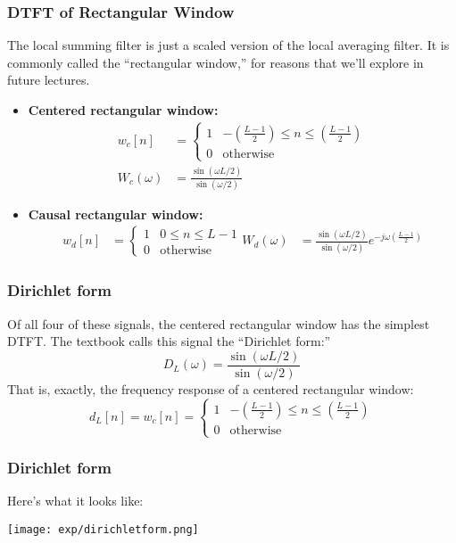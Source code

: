 \documentclass{beamer}
\begin{document}
\begin{frame}
  \frametitle{DTFT of Rectangular Window}

  The local summing filter is just a scaled version of the local
  averaging filter. It is commonly called the ``rectangular window,''
  for reasons that we'll explore in future lectures.
  \begin{itemize}
  \item {\bf Centered rectangular window:}
    \begin{align*}
      w_c[n] &= \begin{cases} 1& -\left(\frac{L-1}{2}\right)\le n\le\left(\frac{L-1}{2}\right)\\
        0&\mbox{otherwise}\end{cases}\\
      W_c(\omega)&=\frac{\sin(\omega L/2)}{\sin(\omega/2)}
    \end{align*}
  \item {\bf Causal rectangular window:}
    \begin{align*}
      w_d[n] &= \begin{cases} 1& 0\le n\le L-1\\
        0&\mbox{otherwise}\end{cases}
      W_d(\omega) &=\frac{\sin(\omega L/2)}{\sin(\omega/2)}e^{-j\omega\left(\frac{L-1}{2}\right)}
    \end{align*}
  \end{itemize}
\end{frame}


\begin{frame}
  \frametitle{Dirichlet form}

  Of all four of these signals, the centered rectangular window has
  the simplest DTFT. The textbook calls this signal the ``Dirichlet
  form:''
  \[
  D_L(\omega) = \frac{\sin(\omega L/2)}{\sin(\omega/2)}
  \]
  That is, exactly, the frequency response of a centered rectangular window:
  \[
  d_L[n] = w_c[n] = \begin{cases}
    1 & -\left(\frac{L-1}{2}\right)\le n\le \left(\frac{L-1}{2}\right)\\
    0 & \mbox{otherwise}
  \end{cases}
  \]
\end{frame}

\begin{frame}
  \frametitle{Dirichlet form}

  Here's what it looks like:
  \centerline{\texttt{[image: exp/dirichletform.png]}}
\end{frame}
  
\end{document}
